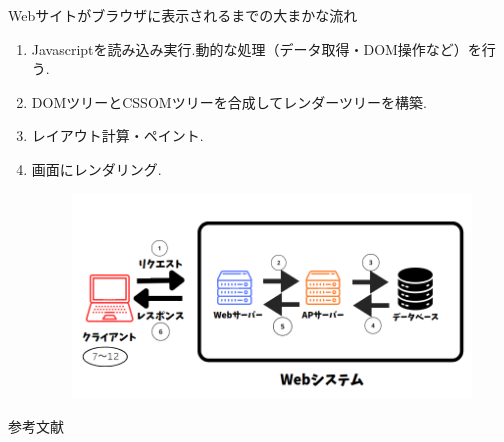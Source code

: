 \documentclass[aspectratio=169]{beamer}
\begin{document}
\begin{frame}[allowframebreaks]{Webサイトがブラウザに表示されるまでの大まかな流れ}
\begin{enumerate}
\begin{figure}
        \end{figure}
        \item Javascriptを読み込み実行.動的な処理（データ取得・DOM操作など）を行う.
        \item DOMツリーとCSSOMツリーを合成してレンダーツリーを構築.
        \item レイアウト計算・ペイント.
        \item 画面にレンダリング.
        \begin{figure}
            \includegraphics[scale=0.20]{webfloat.png}
        \end{figure}
    \end{enumerate}
    
\end{frame}

\begin{frame}[allowframebreaks]{参考文献}
    \small
        
\end{frame}
\end{document}
